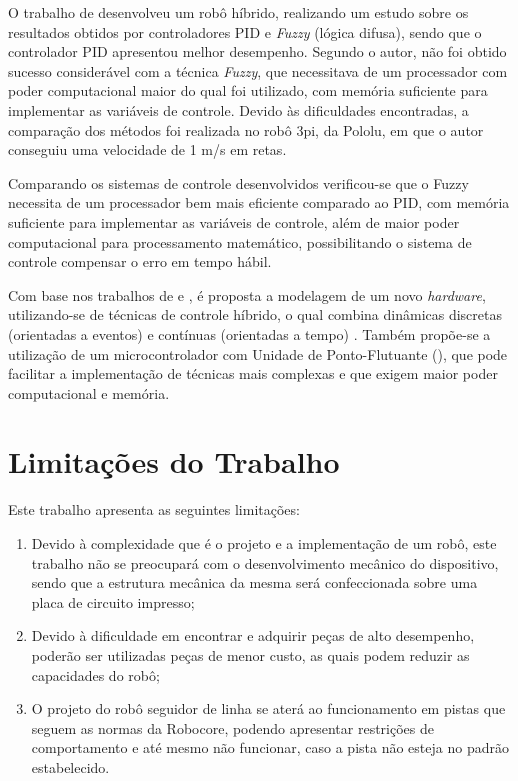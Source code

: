 O trabalho de  desenvolveu um robô híbrido, realizando um estudo sobre os resultados obtidos por controladores
 PID e \textit{Fuzzy} (lógica difusa), sendo que o controlador PID apresentou melhor desempenho. Segundo o autor, não foi 
obtido sucesso considerável com a técnica \textit{Fuzzy}, que necessitava de um processador com poder computacional maior 
do qual foi utilizado, com memória suficiente para implementar as variáveis de controle.
 Devido às dificuldades encontradas, a comparação dos métodos foi 
realizada no robô 3pi, da Pololu, %
em que o autor conseguiu uma velocidade de 1 m/s em retas. \par

Comparando os sistemas de controle desenvolvidos verificou-se que o Fuzzy
necessita de um processador bem mais eficiente comparado ao PID, com memória
suficiente para implementar as variáveis de controle, além de maior poder
computacional para processamento matemático, possibilitando o sistema de controle
compensar o erro em tempo hábil.

Com base nos trabalhos de  e , é proposta a modelagem de um novo 
\textit{hardware}, utilizando-se de técnicas de controle híbrido, o qual combina dinâmicas discretas (orientadas a 
eventos) e contínuas (orientadas a tempo) \cite{cassandras}. Também 
propõe-se a utilização de um microcontrolador com Unidade de Ponto-Flutuante 
(), que pode facilitar a implementação de técnicas mais complexas e 
que exigem maior poder computacional e memória.


\begin{spacing}{2}\end{spacing}
\section{Limitações do Trabalho}\label{limitacoes}

 
Este trabalho apresenta as seguintes limitações:
\begin{enumerate}
 \item Devido à complexidade que é o projeto e a implementação de um robô, este trabalho não se preocupará com 
 o desenvolvimento mecânico do dispositivo, sendo que a estrutura mecânica da mesma será confeccionada 
 sobre uma placa de circuito  impresso;
  \item Devido à dificuldade em encontrar e adquirir peças de alto desempenho, poderão ser utilizadas peças de menor custo, 
  as  quais podem reduzir as capacidades do robô;
 \item O projeto do robô seguidor de linha se aterá ao funcionamento em pistas que seguem as normas da Robocore, podendo 
 apresentar restrições de comportamento e até mesmo não funcionar, caso a pista não esteja no padrão estabelecido. 
\end{enumerate}


